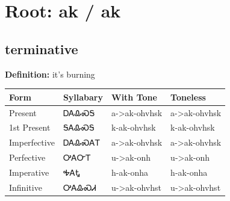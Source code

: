 \documentclass{article}%
\begin{document}
%
\normalsize%
\section*{Root: ak / ak}%
\subsection*{terminative}%
\textbf{Definition: }%
it’s burning%
\\[0.5em]%
\begin{tabular}{|l|l|l|l|}%
\hline%
\textbf{Form}&\textbf{Syllabary}&\textbf{With Tone}&\textbf{Toneless}\\%
\hline%
Present&ᎠᎪᎲᏍᎦ&a{-}>ak{-}ohvhsk&a{-}>ak{-}ohvhsk\\%
1st Present&ᎦᎪᎲᏍᎦ&k{-}ak{-}ohvhsk&k{-}ak{-}ohvhsk\\%
Imperfective&ᎠᎪᎲᏍᎪᎢ&a{-}>ak{-}ohvhsk&a{-}>ak{-}ohvhsk\\%
Perfective&ᎤᎪᏅᎢ&u{-}>ak{-}onh&u{-}>ak{-}onh\\%
Imperative&ᎭᎪᎿ&h{-}ak{-}onha&h{-}ak{-}onha\\%
Infinitive&ᎤᎪᎲᏍᏗ&u{-}>ak{-}ohvhst&u{-}>ak{-}ohvhst\\%
\hline%
\end{tabular}%
\\[1em]%
\end{document}
